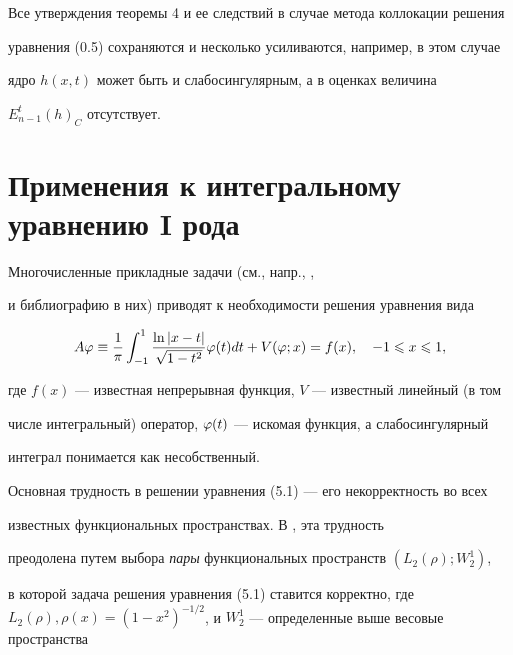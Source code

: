 \begin{notenonum}


Все утверждения теоремы 4 и ее следствий в случае метода коллокации решения 


уравнения (0.5) сохраняются и несколько усиливаются, например, в этом случае 


ядро $h(x,t)$ может быть и слабосингулярным, а в оценках величина


$E_{n-1}^t(h)_C$ отсутствует.


\end{notenonum}








\section{Применения к интегральному уравнению I рода}





Многочисленные прикладные задачи (см., напр., \cite{4}, \cite{5}


и библиографию в них) приводят к необходимости решения уравнения вида


\begin{equation}


A\vp\equiv \frac{1}{\pi}\int_{-1}^1\frac{\ln |x-t|}{\sqrt{1-t^2}}\vp(t)dt+


V(\vp;x)=f(x),\quad -1\lea x\lea 1,


\end{equation}


где $f(x)$ --- известная непрерывная функция, $V$ --- известный линейный (в том


числе интегральный) оператор, $\varphi(t)$ --- искомая функция, а слабосингулярный


интеграл понимается как несобственный.





Основная трудность в решении уравнения (5.1) --- его некорректность во всех 


известных функциональных пространствах. В \cite{4}, \cite{5} эта трудность


преодолена путем выбора {\it пары} функциональных пространств $(L_2(\rho);W_2^1)$,


в которой задача решения уравнения (5.1) ставится корректно, где $L_2(\rho),


\rho(x)=(1-x^2)^{-1/2}$, и $W_2^1$ --- определенные выше весовые пространства


